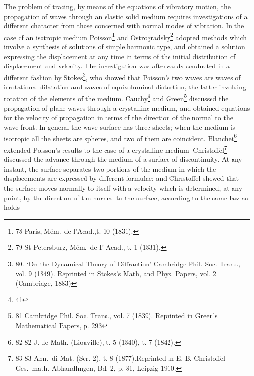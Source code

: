 The problem of tracing, by means of the equations of vibratory motion,
the propagation of waves through an elastic solid medium requires investigations
of a different character from those concerned with normal modes of
vibration. In the case of an isotropic medium
Poisson\footnote{78 Paris, Mém.\ de l'Acad.,t. 10 (1831).}
and Ostrogradsky\footnote{79 St Petersburg, Mém.\ de I' Acad., t. 1 (1831).} adopted
methods which involve a synthesis of solutions of simple harmonic
type, and obtained a solution expressing the displacement at any time in
terms of the initial distribution of displacement and velocity. The investigation
was afterwards conducted in a different fashion by
Stokes\footnote{80. `On the Dynamical Theory of Diffraction'
Cambridge Phil. Soc. Trans., vol. 9 (1849). Reprinted in Stokes's Math, and Phys.
Papers, vol. 2 (Cambridge, 1883)}, who showed
that Poisson's two waves are waves of irrotational dilatation and waves of
equivoluminal distortion, the latter involving rotation of the elements of the
medium. Cauchy\footnote{41} and
\setcounter{footnote}{80}
Green\footnote{81 Cambridge Phil. Soc. Trans., vol. 7 (1839).  Reprinted in
Green's Mathematical Papers, p. 293} discussed the propagation of plane waves
through a crystalline medium, and obtained equations for the velocity of
propagation in terms of the direction of the normal to the wave-front. In general
the wave-surface has three sheets; when the medium is isotropic all the sheets
are spheres, and two of them are coincident. Blanchet\footnote{82 82 J. de Math.
(Liouville), t. 5 (1840), t. 7 (1842).
}
extended Poisson's
results to the case of a crystalline medium. Christoffel\footnote{83 83 Ann.\ di Mat.
(Ser. 2), t. 8 (1877).Reprinted in E. B. Christoffel Ges.\ math. Abhandlmgen, Bd. 2,
p. 81, Leipzig 1910.} discussed the advance
through the medium of a surface of discontinuity. At any instant,
the surface separates two portions of the medium in which the displacements are
expressed by different formulae; and Christoffel showed that the surface moves
normally to itself with a velocity which is determined, at any point, by the
direction of the normal to the surface, according to the same law as holds

